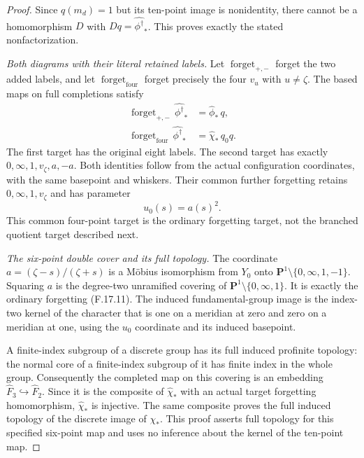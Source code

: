 \begin{proof}
Since $q(m_d)=1$ but its ten-point image is nonidentity,
there cannot be a homomorphism $D$ with
$Dq=\widehat{\phi^\dagger}_*$.
This proves exactly the stated nonfactorization.

\emph{Both diagrams with their literal retained labels.}
Let $\operatorname{forget}_{+,-}$ forget the two added
labels, and let $\operatorname{forget}_{\mathrm{four}}$
forget precisely the four $v_u$ with $u\ne\zeta$.
The based maps on full completions satisfy
\[
\begin{split}
 \operatorname{forget}_{+,-}\,
                    \widehat{\phi^\dagger}_*
       &=\widehat\phi_*\,q,\\
 \operatorname{forget}_{\mathrm{four}}\,
                    \widehat{\phi^\dagger}_*
       &=\widehat\chi_*\,q_0q .
\end{split}                                                     \tag{F.17.10}
\]
The first target has the original eight labels.
The second target has exactly
$0,\infty,1,v_\zeta,a,-a$.
Both identities follow from the actual configuration
coordinates, with the same basepoint and whiskers.
Their common further forgetting retains
$0,\infty,1,v_\zeta$ and has parameter
\[
                          u_0(s)=a(s)^2.                        \tag{F.17.11}
\]
This common four-point target is the ordinary
forgetting target, not the branched quotient target
described next.

\emph{The six-point double cover and its full topology.}
The coordinate $a=(\zeta-s)/(\zeta+s)$ is a M\"obius
isomorphism from $Y_0$ onto
$\mathbf P^1\setminus\{0,\infty,1,-1\}$.
Squaring $a$ is the degree-two unramified covering
of $\mathbf P^1\setminus\{0,\infty,1\}$.
It is exactly the ordinary forgetting (F.17.11).
The induced fundamental-group image is the index-two
kernel of the character that is one on a meridian
at zero and zero on a meridian at one, using the
$u_0$ coordinate and its induced basepoint.

A finite-index subgroup of a discrete group has
its full induced profinite topology: the normal core
of a finite-index subgroup of it has finite index
in the whole group.
Consequently the completed map on this covering is
an embedding $\widehat F_3\hookrightarrow\widehat F_2$.
Since it is the composite of $\widehat\chi_*$
with an actual target forgetting homomorphism,
$\widehat\chi_*$ is injective.
The same composite proves the full induced topology
of the discrete image of $\chi_*$.
This proof asserts full topology for this specified
six-point map and uses no inference about the kernel
of the ten-point map.


\end{proof}
